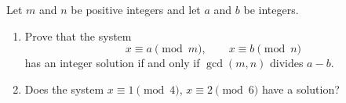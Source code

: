 Let $m$ and $n$ be positive integers and let $a$ and $b$ be integers.
\begin{enumerate}
\item[(a)] Prove that the system
\[x\equiv a\pmod m,\qquad x\equiv b\pmod n\]
has an integer solution if and only if $\gcd(m,n)$ divides $a-b$.
\item[(b)] Does the system $x\equiv1\pmod4$, $x\equiv2\pmod6$ have a solution?
\end{enumerate}
